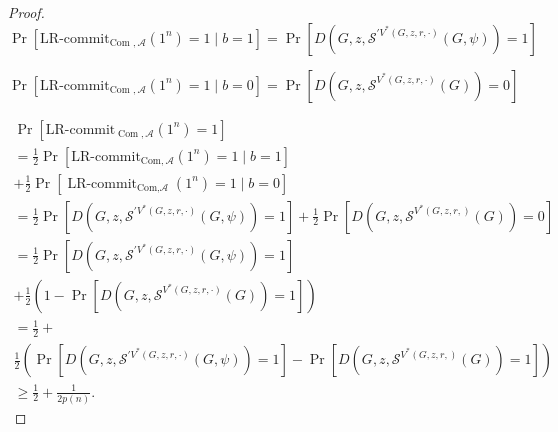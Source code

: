 \documentclass{beamer}
\begin{document}
    \begin{frame}
        \frametitle{}
        \begin{proof}
            


$$
\operatorname{Pr}\left[\text {LR-commit}_{\text {Com }, \mathcal{A}}\left(1^{n}\right)=1 \mid b=1\right]=\operatorname{Pr}\left[D\left(G, z,{\mathcal{S}}^{\prime V^{*}(G, z, r, \cdot)}(G, \psi)\right)=1\right]
$$

$$
\operatorname{Pr}\left[\text {LR-commit}_{\text {Com }, \mathcal{A}}\left(1^{n}\right)=1 \mid b=0\right]=\operatorname{Pr}\left[D\left(G, z, \mathcal{S}^{V^{*}(G, z, r, \cdot)}(G)\right)=0\right]
$$

$$
\begin{array}{l}
\operatorname{Pr}\left[\text {LR-commit}_{\operatorname{Com}, \mathcal{A}}\left(1^{n}\right)=1\right] \\
=\frac{1}{2}  \operatorname{Pr}\left[\text {LR-commit}_{\text {Com}, \mathcal{A}}\left(1^{n}\right)=1 \mid b=1\right]\\
+\frac{1}{2}  \operatorname{Pr}\left[\operatorname{LR-commit}_{\text {Com,} \mathcal{A}}\left(1^{n}\right)=1 \mid b=0\right] \\
=\frac{1}{2}  \operatorname{Pr}\left[D\left(G, z,{\mathcal{S}}^{\prime V^{*}(G, z, r, \cdot)}(G, \psi)\right)=1\right]+\frac{1}{2} \operatorname{Pr}\left[D\left(G, z, \mathcal{S}^{V^{*}(G, z, r, )}(G)\right)=0\right] \\
=\frac{1}{2}  \operatorname{Pr}\left[D\left(G, z, \mathcal{S}^{\prime V^{*}(G, z, r, \cdot)}(G, \psi)\right)=1\right]\\
+\frac{1}{2} \left(1-\operatorname{Pr}\left[D\left(G, z, \mathcal{S}^{V^{*}(G, z, r, \cdot)}(G)\right)=1\right]\right) \\
=\frac{1}{2}+\\
\frac{1}{2} \left(\operatorname{Pr}\left[D\left(G, z, \mathcal{S}^{\prime V^{*}(G, z, r, \cdot)}(G, \psi)\right)=1\right]-\operatorname{Pr}\left[D\left(G, z, \mathcal{S}^{V^{*}(G, z, r,)}(G)\right)=1\right]\right) \\
\geq \frac{1}{2}+\frac{1}{2 p(n)} .
\end{array}
$$
        \end{proof}
        
    
    \end{frame}
\end{document}
